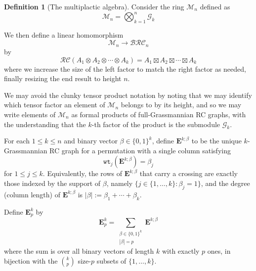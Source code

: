 \documentclass{amsart}
\theoremstyle{definition}
\newtheorem{definition}[lemma]{Definition}
\theoremstyle{remark}
\numberwithin{equation}{subsection}
\newcommand{\wtt}{\mathtt{wt}}
\newcommand{\grass}{\mathcal{G}}
\newcommand{\hr}{\mathtt{ht}}
\newcommand{\BRC}{\mathcal{BRC}}
\newcommand{\RC}{\mathcal{RC}}
\begin{document}
\begin{definition}[The multiplactic algebra]
Consider the ring $\mathcal{M}_n$ defined as
$$\mathcal{M}_n = \bigotimes_{k=1}^n \grass_k$$

We then define a linear homomorphism
$$\mathcal{M}_n\to \BRC_n$$
by
$$\RC(A_1\otimes A_2\otimes \cdots \otimes A_k) = A_1\boxtimes A_2\boxtimes \cdots \boxtimes A_k$$
where we increase the size of the left factor to match the right factor as needed, finally resizing the end result to height $n$.

We may avoid the clunky tensor product notation by noting that we may identify which tensor factor an element of $\mathcal{M}_n$ belongs to by its height, and so we may write elements of $\mathcal{M}_n$ as formal products of full-Grassmannian RC graphs, with the understanding that the $k$-th factor of the product is the submodule $\grass_k$.

For each $1\leq k\leq n$ and binary vector $\beta\in\{0,1\}^k$, define $\mathbf{E}^{k;\beta}$ to be the unique $k$-Grassmannian RC graph for a permutation with a single column satisfying
$$\wtt_j(\mathbf{E}^{k;\beta}) = \beta_j$$
for $1\leq j\leq k$. Equivalently, the rows of $\mathbf{E}^{k;\beta}$ that carry a crossing are exactly those indexed by the support of $\beta$, namely $\{j\in\{1,\ldots,k\}:\beta_j=1\}$, and the degree (column length) of $\mathbf{E}^{k;\beta}$ is $|\beta|:=\beta_1+\cdots+\beta_k$.

Define $\mathbf{E}_{p}^k$ by
$$\mathbf{E}_{p}^k = \sum_{\substack{\beta\in\{0,1\}^k\\ |\beta|=p}} \mathbf{E}^{k;\beta}$$
where the sum is over all binary vectors of length $k$ with exactly $p$ ones, in bijection with the $\binom{k}{p}$ size-$p$ subsets of $\{1,\ldots,k\}$.
\end{definition}
\end{document}
